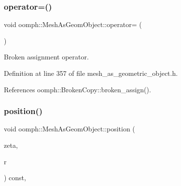 \mbox{\label{classoomph_1_1MeshAsGeomObject_a096b43730ef42a1df00ebc51fa114951}} 
\subsubsection{\texorpdfstring{operator=()}{operator=()}}
{\footnotesize\ttfamily void oomph\+::\+Mesh\+As\+Geom\+Object\+::operator= (\begin{DoxyParamCaption}\item[{const \hyperlink{classoomph_1_1MeshAsGeomObject}{Mesh\+As\+Geom\+Object} \&}]{ }\end{DoxyParamCaption})\hspace{0.3cm}{\ttfamily [inline]}}



Broken assignment operator. 



Definition at line 357 of file mesh\+\_\+as\+\_\+geometric\+\_\+object.\+h.



References oomph\+::\+Broken\+Copy\+::broken\+\_\+assign().

\mbox{\label{classoomph_1_1MeshAsGeomObject_ad071793f5cee36eef0e56dbeeebf4c24}} 
\subsubsection{\texorpdfstring{position()}{position()}\hspace{0.1cm}{\footnotesize\ttfamily [1/2]}}
{\footnotesize\ttfamily void oomph\+::\+Mesh\+As\+Geom\+Object\+::position (\begin{DoxyParamCaption}\item[{const \hyperlink{classoomph_1_1Vector}{Vector}$<$ double $>$ \&}]{zeta,  }\item[{\hyperlink{classoomph_1_1Vector}{Vector}$<$ double $>$ \&}]{r }\end{DoxyParamCaption}) const\hspace{0.3cm}{\ttfamily [inline]}, {\ttfamily [virtual]}}



